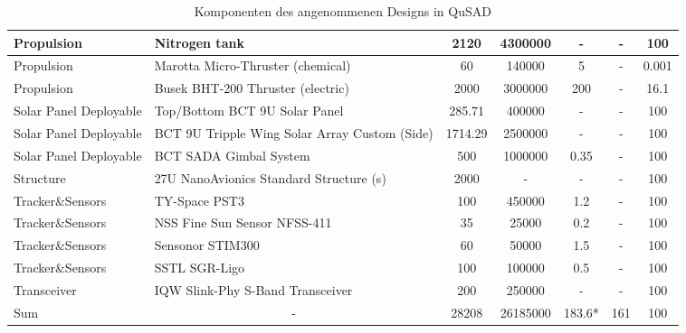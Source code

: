 \begin{landscape}
\begin{table}
\begin{tabular}{|l|l|c|c|c|c|c|}
\hline
Propulsion                     & Nitrogen tank                                 & 2120    & 4300000     & -                         & -            & 100           \\ 
\hline
Propulsion                     & Marotta Micro-Thruster (chemical)             & 60      & 140000      & 5                         & -            & 0.001         \\ 
\hline
Propulsion                     & Busek BHT-200 Thruster (electric)             & 2000    & 3000000     & 200                       & -            & 16.1          \\ 
\hline
Solar Panel Deployable         & Top/Bottom BCT 9U Solar Panel                 & 285.71  & 400000      & -                         & -            & 100           \\ 
\hline
Solar Panel Deployable         & BCT 9U Tripple Wing Solar Array Custom (Side) & 1714.29 & 2500000     & -                         & -            & 100           \\ 
\hline
Solar Panel Deployable         & BCT SADA Gimbal System                        & 500     & 1000000     & 0.35                      & -            & 100           \\ 
\hline
Structure                      & 27U NanoAvionics Standard Structure (s)       & 2000    & -           & -                         & -            & 100           \\ 
\hline
Tracker\&Sensors               & TY-Space PST3                                 & 100     & 450000      & 1.2                       & -            & 100           \\ 
\hline
Tracker\&Sensors               & NSS Fine Sun Sensor NFSS-411                  & 35      & 25000       & 0.2                       & -            & 100           \\ 
\hline
Tracker\&Sensors               & Sensonor STIM300                              & 60      & 50000       & 1.5                       & -            & 100           \\ 
\hline
Tracker\&Sensors               & SSTL SGR-Ligo                                 & 100     & 100000      & 0.5                       & -            & 100           \\ 
\hline
Transceiver                    & IQW Slink-Phy S-Band Transceiver              & 200     & 250000      & -                         & -            & 100           \\ 
\hline
Sum                            & \multicolumn{1}{c|}{-}                        & 28208   & 26185000    & 183.6*                    & 161          & 100           \\
\end{tabular}
\caption{Komponenten des angenommenen Designs in QuSAD}
\label{qusadwerte}
\end{table}
\end{landscape}
